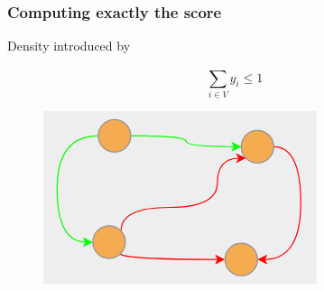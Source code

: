\documentclass{beamer}
\begin{document}
\begin{frame}[c]
	\frametitle{Computing exactly the score}
	Density introduced by

	\begin{equation*}
		\sum^{}_{i \in V} y_i \leq 1
	\end{equation*}

	\begin{figure}[htpb]
		\centering
		\includegraphics[width=0.3\linewidth]{img/graph-example2-1.png}
	\end{figure}
\end{frame}
\end{document}
